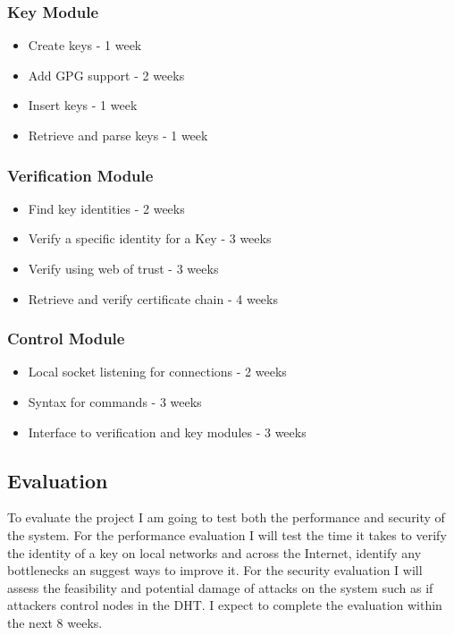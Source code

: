 \documentclass[10pt, a4paper]{article}
\begin{document}
\subsubsection{Key Module}
\begin{itemize}[noitemsep]
  \item Create keys - 1 week
  \item Add GPG support - 2 weeks
  \item Insert keys - 1 week
  \item Retrieve and parse keys - 1 week
\end{itemize}
\subsubsection{Verification Module}
\begin{itemize}[noitemsep]
  \item Find key identities - 2 weeks
  \item Verify a specific identity for a Key - 3 weeks
  \item Verify using web of trust - 3 weeks
  \item Retrieve and verify certificate chain - 4 weeks
\end{itemize}
\subsubsection{Control Module}
\begin{itemize}[noitemsep]
  \item Local socket listening for connections - 2 weeks
  \item Syntax for commands - 3 weeks
  \item Interface to verification and key modules - 3 weeks
\end{itemize}
\subsection{Evaluation}
To evaluate the project I am going to test both the performance and security of the system. For the performance evaluation I will test the time it takes to verify the identity of a key on local networks and across the Internet, identify any bottlenecks an suggest ways to improve it. For the security evaluation I will assess the feasibility and potential damage of attacks on the system such as if attackers control nodes in the DHT. I expect to complete the evaluation within the next 8 weeks.
\end{document}
